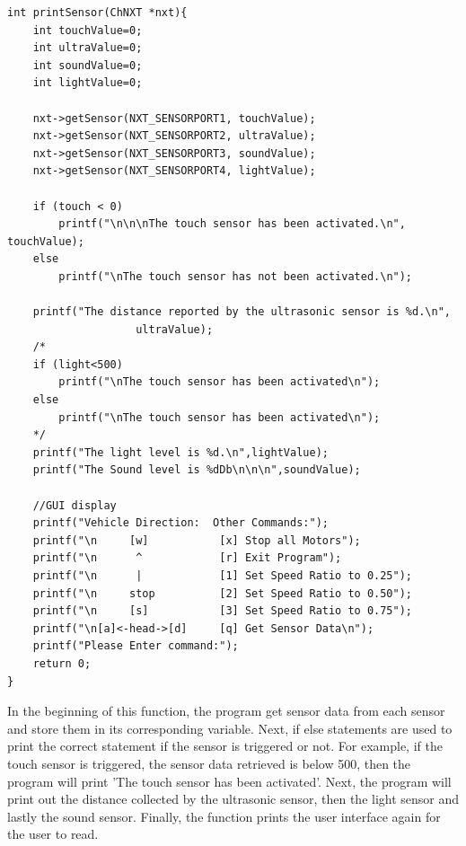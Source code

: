 \documentclass[11pt]{article}
\begin{document}
\begin{verbatim}
int printSensor(ChNXT *nxt){
    int touchValue=0;
    int ultraValue=0;
    int soundValue=0;
    int lightValue=0;

    nxt->getSensor(NXT_SENSORPORT1, touchValue);
    nxt->getSensor(NXT_SENSORPORT2, ultraValue);
    nxt->getSensor(NXT_SENSORPORT3, soundValue);
    nxt->getSensor(NXT_SENSORPORT4, lightValue);

    if (touch < 0)
        printf("\n\n\nThe touch sensor has been activated.\n", touchValue);
    else
        printf("\nThe touch sensor has not been activated.\n");

    printf("The distance reported by the ultrasonic sensor is %d.\n",
                    ultraValue);
    /*
    if (light<500)  
        printf("\nThe touch sensor has been activated\n");
    else    
        printf("\nThe touch sensor has been activated\n");
    */
    printf("The light level is %d.\n",lightValue);
    printf("The Sound level is %dDb\n\n\n",soundValue);
    
    //GUI display
    printf("Vehicle Direction:  Other Commands:");
    printf("\n     [w]           [x] Stop all Motors");
    printf("\n      ^            [r] Exit Program");
    printf("\n      |            [1] Set Speed Ratio to 0.25");
    printf("\n     stop          [2] Set Speed Ratio to 0.50");
    printf("\n     [s]           [3] Set Speed Ratio to 0.75");
    printf("\n[a]<-head->[d]     [q] Get Sensor Data\n");
    printf("Please Enter command:");
    return 0;
}
\end{verbatim}

In the beginning of this function, the program get sensor data from each sensor and store them in its corresponding
variable. Next, if else statements are used to print the correct statement if the sensor is triggered or not.
For example, if the touch sensor is triggered, the sensor data retrieved is below 500, then the program will
print 'The touch sensor has been activated'. Next, the program will print out the distance collected by the 
ultrasonic sensor, then the light sensor and lastly the sound sensor. Finally, the function prints the user 
interface again for the user to read.
\newpage
\appendix


\end{document}
